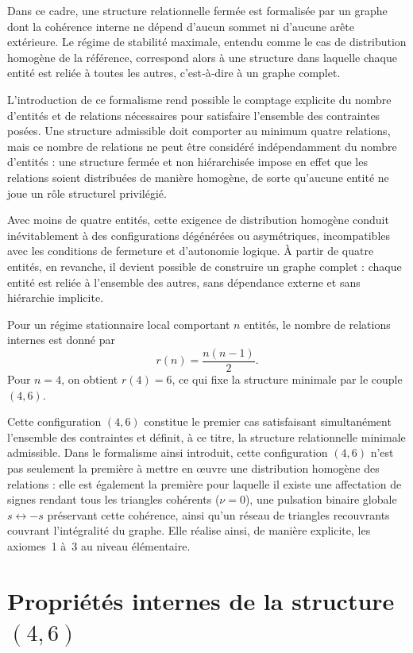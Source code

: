 \documentclass[11pt,a4paper]{article}
\begin{document}
Dans ce cadre, une structure relationnelle fermée est formalisée par un graphe dont la cohérence interne ne dépend d’aucun sommet ni d’aucune arête extérieure. Le régime de stabilité maximale, entendu comme le cas de distribution homogène de la référence, correspond alors à une structure dans laquelle chaque entité est reliée à toutes les autres, c’est‑à‑dire à un graphe complet.

L’introduction de ce formalisme rend possible le comptage explicite du nombre d’entités et de relations nécessaires pour satisfaire l’ensemble des contraintes posées. Une structure admissible doit comporter au minimum quatre relations, mais ce nombre de relations ne peut être considéré indépendamment du nombre d’entités : une structure fermée et non hiérarchisée impose en effet que les relations soient distribuées de manière homogène, de sorte qu’aucune entité ne joue un rôle structurel privilégié.

Avec moins de quatre entités, cette exigence de distribution homogène conduit inévitablement à des configurations dégénérées ou asymétriques, incompatibles avec les conditions de fermeture et d’autonomie logique. À partir de quatre entités, en revanche, il devient possible de construire un graphe complet : chaque entité est reliée à l’ensemble des autres, sans dépendance externe et sans hiérarchie implicite.

Pour un régime stationnaire local comportant \(n\) entités, le nombre de relations internes est donné par
\[
r(n) = \frac{n(n-1)}{2}.
\]
Pour \(n = 4\), on obtient \(r(4) = 6\), ce qui fixe la structure minimale par le couple \((4,6)\).

Cette configuration \((4,6)\) constitue le premier cas satisfaisant simultanément l’ensemble des contraintes et définit, à ce titre, la structure relationnelle minimale admissible. Dans le formalisme ainsi introduit, cette configuration \((4,6)\) n’est pas seulement la première à mettre en œuvre une distribution homogène des relations : elle est également la première pour laquelle il existe une affectation de signes rendant tous les triangles cohérents (\(\nu = 0\)), une pulsation binaire globale \(s \leftrightarrow -s\) préservant cette cohérence, ainsi qu’un réseau de triangles recouvrants couvrant l’intégralité du graphe. Elle réalise ainsi, de manière explicite, les axiomes~1 à~3 au niveau élémentaire.

\section{Propriétés internes de la structure \texorpdfstring{\(\left(4,6\right)\)}{(4,6)}}
\end{document}
